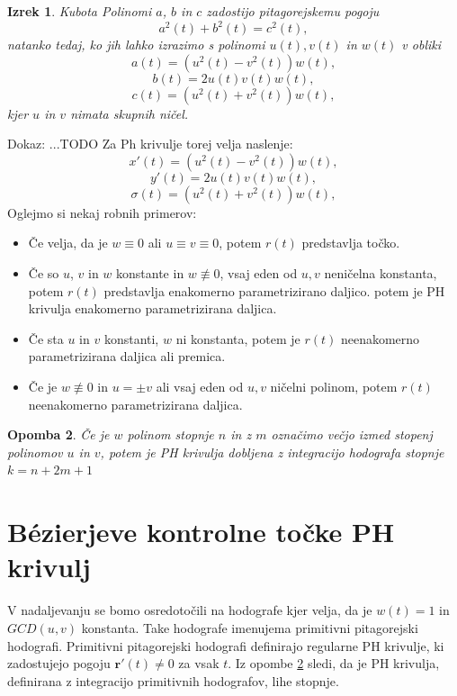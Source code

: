 \documentclass[12pt]{article}
\newtheorem{Izrek}{{\sc Izrek}}[section]
\newtheorem{Opomba}[Izrek]{{\sc Opomba}}
\begin{document}
\begin{Izrek}{Kubota}\newline
	\label{Kubota}
	Polinomi $a$, $b$ in $c$ zadostijo pitagorejskemu pogoju
	$$a^2(t) + b^2(t) = c^2(t),$$
	natanko tedaj, ko jih lahko izrazimo s polinomi $u(t), v(t)$ in $w(t)$ v obliki
	$$a(t) = (u^2(t) - v^2(t))w(t),$$
	$$b(t) = 2u(t)v(t)w(t),$$
	$$c(t) = (u^2(t) + v^2(t))w(t),$$
	kjer $u$ in $v$ nimata skupnih ničel.
\end{Izrek}
Dokaz: ...TODO\newline
Za Ph krivulje torej velja naslenje:
$$x'(t) = (u^2(t) - v^2(t))w(t),$$
$$y'(t) = 2u(t)v(t)w(t),$$
$$\sigma(t) = (u^2(t) + v^2(t))w(t),$$
Oglejmo si nekaj robnih primerov:
\begin{itemize}
	\item Če velja, da je $w\equiv0$ ali $u\equiv v \equiv 0$, potem $r(t)$ predstavlja točko.
	\item Če so $u$, $v$ in $w$ konstante in $w \not\equiv 0$, vsaj eden od $u, v$ neničelna konstanta, potem $r(t)$ predstavlja enakomerno parametrizirano daljico.
	potem je PH krivulja enakomerno parametrizirana daljica.
	\item Če sta $u$ in $v$ konstanti, $w$  ni konstanta, potem je  $r(t)$ neenakomerno parametrizirana daljica ali premica.
	\item Če je $w \not\equiv 0$ in $u = \pm v$ ali vsaj eden od $u, v$ ničelni polinom, 
	potem $r(t)$ neenakomerno parametrizirana daljica.
\end{itemize}
\begin{Opomba}
	\label{Stopnja}
	Če je $w$ polinom stopnje $n$ in z $m$ označimo večjo izmed stopenj polinomov $u$ in $v$, 
potem je PH krivulja dobljena z integracijo hodografa stopnje $k = n + 2m + 1$
\end{Opomba}

\section{B\'ezierjeve kontrolne točke PH krivulj}
V nadaljevanju se bomo osredotočili na hodografe kjer velja, da je $w(t) = 1$ in $GCD(u,v)$ konstanta.
Take hodografe imenujema primitivni pitagorejski hodografi. 
Primitivni pitagorejski hodografi definirajo regularne PH krivulje, ki zadostujejo pogoju $\textbf{r}'(t) \neq 0$ za vsak $t$. 
Iz opombe \ref{Stopnja} sledi, da je PH krivulja, definirana z integracijo
primitivnih hodografov, lihe stopnje.
\end{document}
